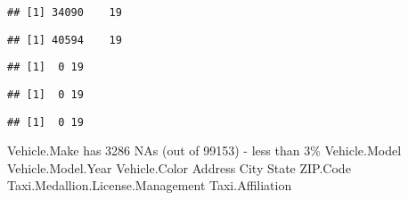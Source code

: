 \documentclass[
]{article}
\newenvironment{Shaded}{\begin{snugshade}}{\end{snugshade}}
\newcommand{\FunctionTok}[1]{\textcolor[rgb]{0.13,0.29,0.53}{\textbf{#1}}}
\newcommand{\NormalTok}[1]{#1}
\newcommand{\SpecialCharTok}[1]{\textcolor[rgb]{0.81,0.36,0.00}{\textbf{#1}}}
\begin{document}
\begin{verbatim}
## [1] 34090    19
\end{verbatim}

\begin{Shaded}
\end{Shaded}

\begin{verbatim}
## [1] 40594    19
\end{verbatim}

\begin{Shaded}
\end{Shaded}

\begin{verbatim}
## [1]  0 19
\end{verbatim}

\begin{Shaded}
\end{Shaded}

\begin{verbatim}
## [1]  0 19
\end{verbatim}

\begin{Shaded}
\end{Shaded}

\begin{verbatim}
## [1]  0 19
\end{verbatim}

Vehicle.Make has 3286 NAs (out of 99153) - less than 3\% Vehicle.Model
Vehicle.Model.Year Vehicle.Color Address City State ZIP.Code
Taxi.Medallion.License.Management Taxi.Affiliation
\end{document}
